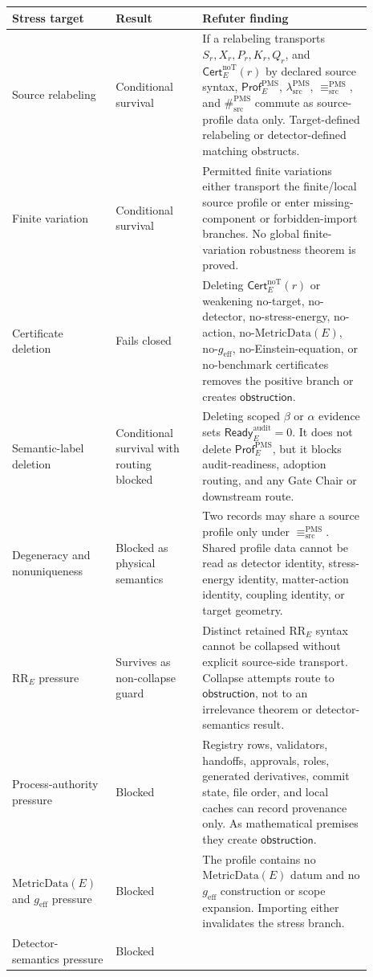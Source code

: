 \documentclass[11pt]{article}
\newcommand{\Prof}{\mathsf{Prof}^{\mathrm{PMS}}_E}
\newcommand{\Ready}{\mathsf{Ready}^{\mathrm{audit}}_E}
\newcommand{\Cert}{\mathsf{Cert}^{\mathrm{noT}}_E}
\newcommand{\lambdaProf}{\lambda^{\mathrm{PMS}}_{\mathrm{src}}}
\newcommand{\EqProf}{\equiv^{\mathrm{PMS}}_{\mathrm{src}}}
\newcommand{\SepProf}{\#^{\mathrm{PMS}}_{\mathrm{src}}}
\newcommand{\Obstruction}{\mathsf{obstruction}}
\newcommand{\RRE}{\mathrm{RR}_E}
\newcommand{\MetricData}{\mathrm{MetricData}}
\newcommand{\geff}{g_{\mathrm{eff}}}
\begin{document}
\begin{longtable}{p{0.24\linewidth}p{0.22\linewidth}p{0.43\linewidth}}
\toprule
Stress target & Result & Refuter finding \\
\midrule
Source relabeling & Conditional survival &
If a relabeling transports \(S_r,X_r,P_r,K_r,Q_r\), and \(\Cert(r)\) by
declared source syntax, \(\Prof\), \(\lambdaProf\), \(\EqProf\), and
\(\SepProf\) commute as source-profile data only. Target-defined relabeling
or detector-defined matching obstructs. \\
Finite variation & Conditional survival &
Permitted finite variations either transport the finite/local source profile
or enter missing-component or forbidden-import branches. No global
finite-variation robustness theorem is proved. \\
Certificate deletion & Fails closed &
Deleting \(\Cert(r)\) or weakening no-target, no-detector, no-stress-energy,
no-action, no-\(\MetricData(E)\), no-\(\geff\), no-Einstein-equation, or
no-benchmark certificates removes the positive branch or creates
\(\Obstruction\). \\
Semantic-label deletion & Conditional survival with routing blocked &
Deleting scoped \(\beta\) or \(\alpha\) evidence sets \(\Ready=0\). It does not
delete \(\Prof\), but it blocks audit-readiness, adoption routing, and any
Gate Chair or downstream route. \\
Degeneracy and nonuniqueness & Blocked as physical semantics &
Two records may share a source profile only under \(\EqProf\). Shared profile
data cannot be read as detector identity, stress-energy identity,
matter-action identity, coupling identity, or target geometry. \\
\(\RRE\) pressure & Survives as non-collapse guard &
Distinct retained \(\RRE\) syntax cannot be collapsed without explicit
source-side transport. Collapse attempts route to \(\Obstruction\), not to an
irrelevance theorem or detector-semantics result. \\
Process-authority pressure & Blocked &
Registry rows, validators, handoffs, approvals, roles, generated derivatives,
commit state, file order, and local caches can record provenance only. As
mathematical premises they create \(\Obstruction\). \\
\(\MetricData(E)\) and \(\geff\) pressure & Blocked &
The profile contains no \(\MetricData(E)\) datum and no \(\geff\) construction
or scope expansion. Importing either invalidates the stress branch. \\
Detector-semantics pressure & Blocked &

\end{longtable}
\end{document}
